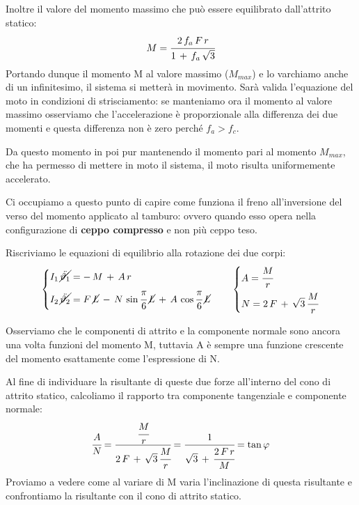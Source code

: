 Inoltre il valore del momento massimo che può essere equilibrato dall'attrito statico:
\[M = \cfrac{2\,f_a\,F\,r}{1\,+\,f_a\,\sqrt{3}}\]
Portando dunque il momento M al valore massimo ($M_{max}$) e lo varchiamo anche di un infinitesimo, il sistema si metterà in movimento. Sarà valida l'equazione del moto in condizioni di strisciamento: se manteniamo ora il momento al valore massimo osserviamo che l'accelerazione è proporzionale alla differenza dei due momenti e questa differenza non è zero perché $f_a > f_c$.

Da questo momento in poi pur mantenendo il momento pari al momento $M_{max}$, che ha permesso di mettere in moto il sistema, il moto risulta uniformemente accelerato.\newline

Ci occupiamo a questo punto di capire come funziona il freno all'inversione del verso del momento applicato al tamburo: ovvero quando esso opera nella configurazione di \textbf{ceppo compresso} e non più ceppo teso.

Riscriviamo le equazioni di equilibrio alla rotazione dei due corpi:
\[
\begin{dcases}
I_1\,\cancel{\ddot{\theta_1}} = -\,M\,+\,A\,r\\
I_2\,\cancel{\ddot{\theta_2}} = F\,\cancel{L}\,-\,N\,\sin{\cfrac{\pi}{6}}\,\cancel{L}\,+\,A\,\cos{\cfrac{\pi}{6}}\,\cancel{L}
\end{dcases}
\qquad
\begin{dcases}
A = \cfrac{M}{r}\\
N = 2\,F\,+\,\sqrt{3}\,\cfrac{M}{r}
\end{dcases}
\]

Osserviamo che le componenti di attrito e la componente normale sono ancora una volta funzioni del momento M, tuttavia A è sempre una funzione crescente del momento esattamente come l'espressione di N.

Al fine di individuare la risultante di queste due forze all'interno del cono di attrito statico, calcoliamo il rapporto tra componente tangenziale e componente normale:
\[\cfrac{A}{N} = \cfrac{\cfrac{M}{r}}{2\,F\,+\,\sqrt{3}\,\cfrac{M}{r}} = \cfrac{1}{\sqrt{3}\,+\,\cfrac{2\,F\,r}{M}} = \tan{\varphi}\]
Proviamo a vedere come al variare di M varia l'inclinazione di questa risultante e confrontiamo la risultante con il cono di attrito statico.

